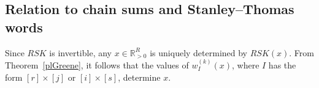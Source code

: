 \documentclass[ALCO,Unicode,published]{cedram}
\numberwithin{equation}{section}
\begin{document}

\subsection{Relation to chain sums and Stanley--Thomas words}








Since $RSK$ is invertible, any $x \in \mathbb R^R_{>0}$ is uniquely determined by $RSK(x)$. From Theorem~\ref{plGreene}, it follows that the values of $w_{I}^{(k)}(x)$, where $I$ has the form $[r]\times[j]$ or $[i]\times[s]$, determine $x$.
\end{document}
